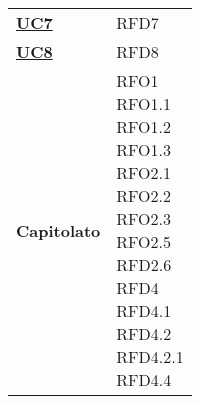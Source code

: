 \begin{longtable}[H]{| >{\centering\bfseries}p{8cm} | >{\centering\arraybackslash}p{8cm} |}
    \hyperref[sub:uc7]{UC7}          & RFD7                                                                      \\

    \hyperref[sub:uc8]{UC8}          & RFD8                                                                      \\

    Capitolato                       &
    \makecell{
        \rule{0pt}{4ex}
    RFO1                                                                                                         \\
    RFO1.1                                                                                                       \\
    RFO1.2                                                                                                       \\
    RFO1.3                                                                                                       \\
    RFO2.1                                                                                                       \\
    RFO2.2                                                                                                       \\
    RFO2.3                                                                                                       \\
    RFO2.5                                                                                                       \\
    RFD2.6                                                                                                       \\
    RFD4                                                                                                         \\
    RFD4.1                                                                                                       \\
    RFD4.2                                                                                                       \\
    RFD4.2.1                                                                                                     \\
    RFD4.4                                                                                                       \\
}
\end{longtable}
